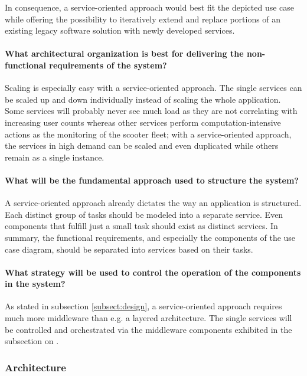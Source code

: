\documentclass[12pt,a4paper,twoside]{report}
\begin{document}
In consequence, a service-oriented approach would best fit the depicted use case
while offering the possibility to iteratively extend and replace portions of
an existing legacy software solution with newly developed services.

\paragraph{What architectural organization is best for delivering the non-functional requirements of the system?}
Scaling is especially easy with a service-oriented approach. The single services
can be scaled up and down individually instead of scaling the whole application.
Some services will probably never see much load as they are not correlating with
increasing user counts whereas other services perform computation-intensive
actions as the monitoring of the scooter fleet; with a service-oriented approach,
the services in high demand can be scaled and even duplicated while others
remain as a single instance.

\paragraph{What will be the fundamental approach used to structure the system?}
A service-oriented approach already dictates the way an application is structured.
Each distinct group of tasks should be modeled into a separate service.
Even components that fulfill just a small task should exist as distinct services.
In summary, the functional requirements, and especially the components of
the use case diagram, should be separated into services based on their tasks.

\paragraph{What strategy will be used to control the operation of the components in the system?}
As stated in subsection \ref{subsect:design}, a service-oriented approach
requires much more middleware than e.g. a layered architecture.
The single services will be controlled and orchestrated via the middleware components
exhibited in the subsection on \textit{}.


\subsubsection{Architecture}
\end{document}
